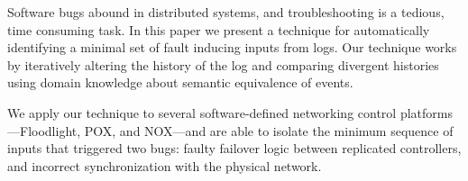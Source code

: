 Software bugs abound in distributed systems, and troubleshooting
is a tedious, time consuming task.
In this paper we present a technique for automatically identifying
a minimal set of fault inducing inputs from logs. Our technique works by
iteratively altering the history of the log and comparing divergent histories
using domain knowledge about semantic equivalence of events.

We apply our technique to several software-defined networking control
platforms---Floodlight, POX, and NOX---and
are able to isolate the minimum sequence of inputs that triggered
two bugs: faulty failover logic between replicated controllers, and incorrect
synchronization with the physical network.
